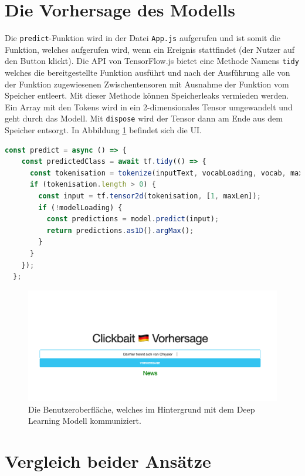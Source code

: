 \section{Die Vorhersage des Modells}
Die \texttt{predict}-Funktion wird in der Datei \texttt{App.js} aufgerufen und ist somit die Funktion, welches aufgerufen wird, wenn ein Ereignis stattfindet (der Nutzer auf den Button klickt). Die API von TensorFlow.js bietet eine Methode Namens \texttt{tidy} welches die bereitgestellte Funktion ausführt und nach der Ausführung alle von der Funktion zugewiesenen Zwischentensoren mit Ausnahme der Funktion vom Speicher entleert. Mit dieser Methode können Speicherleaks vermieden werden. Ein Array mit den Tokens wird in ein 2-dimensionales Tensor umgewandelt und geht durch das Modell. Mit \texttt{dispose} wird der Tensor dann am Ende aus dem Speicher entsorgt. In Abbildung \ref{Frontend} befindet sich die UI.

\begin{lstlisting}[language=JavaScript, caption=Auszug aus der predict Funktion, label={prediJS}]
const predict = async () => {
    const predictedClass = await tf.tidy(() => {
      const tokenisation = tokenize(inputText, vocabLoading, vocab, maxLen);
      if (tokenisation.length > 0) {
        const input = tf.tensor2d(tokenisation, [1, maxLen]);
        if (!modelLoading) {
          const predictions = model.predict(input);
          return predictions.as1D().argMax();
        }
      }
    });
  };
\end{lstlisting}


\begin{figure}[H]
    \centering
    \includegraphics[width=14cm]{kapitel5/frontend.png}
    \caption[Das Frontend]{Die Benutzeroberfläche, welches im Hintergrund mit dem Deep Learning Modell kommuniziert.}
    \label{Frontend}
\end{figure}

\section{Vergleich beider Ansätze}


